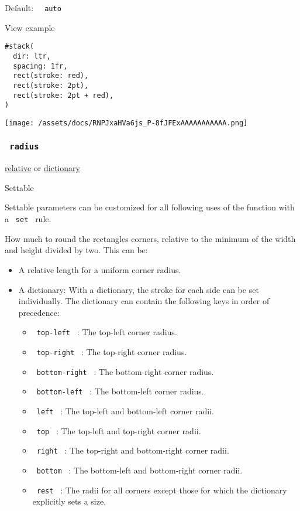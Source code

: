 Default: \texttt{\ }{\texttt{\ auto\ }}\texttt{\ }


View example

\begin{verbatim}
#stack(
  dir: ltr,
  spacing: 1fr,
  rect(stroke: red),
  rect(stroke: 2pt),
  rect(stroke: 2pt + red),
)
\end{verbatim}

\texttt{[image: /assets/docs/RNPJxaHVa6js\_P-8fJFExAAAAAAAAAAA.png]}

\subsubsection{\texorpdfstring{\texttt{\ radius\ }}{ radius }}\label{parameters-radius}

\href{/docs/reference/layout/relative/}{relative} {or}
\href{/docs/reference/foundations/dictionary/}{dictionary}

{{ Settable }}

\label{parameters-radius-settable-tooltip}
Settable parameters can be customized for all following uses of the
function with a \texttt{\ set\ } rule.

How much to round the rectangle\textquotesingle s corners, relative to
the minimum of the width and height divided by two. This can be:

\begin{itemize}
\tightlist
\item
  A relative length for a uniform corner radius.
\item
  A dictionary: With a dictionary, the stroke for each side can be set
  individually. The dictionary can contain the following keys in order
  of precedence:

  \begin{itemize}
  \tightlist
  \item
    \texttt{\ top-left\ } : The top-left corner radius.
  \item
    \texttt{\ top-right\ } : The top-right corner radius.
  \item
    \texttt{\ bottom-right\ } : The bottom-right corner radius.
  \item
    \texttt{\ bottom-left\ } : The bottom-left corner radius.
  \item
    \texttt{\ left\ } : The top-left and bottom-left corner radii.
  \item
    \texttt{\ top\ } : The top-left and top-right corner radii.
  \item
    \texttt{\ right\ } : The top-right and bottom-right corner radii.
  \item
    \texttt{\ bottom\ } : The bottom-left and bottom-right corner radii.
  \item
    \texttt{\ rest\ } : The radii for all corners except those for which
    the dictionary explicitly sets a size.
  \end{itemize}
\end{itemize}

